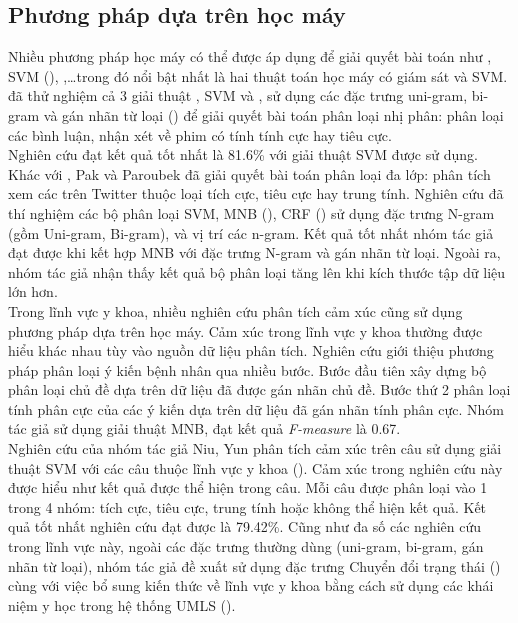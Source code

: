 \subsection{Phương pháp dựa trên học máy}
Nhiều phương pháp học máy có thể được áp dụng để giải quyết bài toán như , SVM (), ,\ldots trong đó nổi bật nhất là hai thuật toán học máy có giám sát  và SVM. \cite{pang2002thumbs} đã thử nghiệm cả 3 giải thuật , SVM và , sử dụng các đặc trưng uni-gram, bi-gram và gán nhãn từ loại () để giải quyết bài toán phân loại nhị phân: phân loại các bình luận, nhận xét về phim có tính tính cực hay tiêu cực. \\

Nghiên cứu đạt kết quả tốt nhất là 81.6\% với giải thuật SVM được sử dụng. Khác với \cite{pang2002thumbs}, Pak và Paroubek \cite{Zhang2015} đã giải quyết bài toán phân loại đa lớp: phân tích xem các  trên Twitter thuộc loại tích cực, tiêu cực hay trung tính. Nghiên cứu đã thí nghiệm các bộ phân loại SVM, MNB (), CRF () sử dụng đặc trưng N-gram (gồm Uni-gram, Bi-gram), và vị trí các n-gram. Kết quả tốt nhất nhóm tác giả đạt được khi kết hợp MNB với đặc trưng N-gram và gán nhãn từ loại. Ngoài ra, nhóm tác giả nhận thấy kết quả bộ phân loại tăng lên khi kích thước tập dữ liệu lớn hơn.\\

Trong lĩnh vực y khoa, nhiều nghiên cứu phân tích cảm xúc cũng sử dụng phương pháp dựa trên học máy. Cảm xúc trong lĩnh vực y khoa thường được hiểu khác nhau tùy vào nguồn dữ liệu phân tích.
Nghiên cứu \cite{xia09improving} giới thiệu phương pháp phân loại ý kiến bệnh nhân qua nhiều bước. Bước đầu tiên xây dựng bộ phân loại chủ đề dựa trên dữ liệu đã được gán nhãn chủ đề. Bước thứ 2 phân loại tính phân cực của các ý kiến dựa trên dữ liệu đã gán nhãn tính phân cực. Nhóm tác giả sử dụng giải thuật MNB, đạt kết quả \textit{F-measure} là 0.67.\\

Nghiên cứu của nhóm tác giả Niu, Yun \cite{niu2005analysis} phân tích cảm xúc trên câu sử dụng giải thuật SVM với các câu thuộc lĩnh vực y khoa (). Cảm xúc trong nghiên cứu này được hiểu như kết quả  được thể hiện trong câu. Mỗi câu được phân loại vào 1 trong 4 nhóm: tích cực, tiêu cực, trung tính hoặc không thể hiện kết quả. Kết quả tốt nhất nghiên cứu đạt được là 79.42\%. Cũng như đa số các nghiên cứu trong lĩnh vực này, ngoài các đặc trưng thường dùng (uni-gram, bi-gram, gán nhãn từ loại), nhóm tác giả đề xuất sử dụng đặc trưng Chuyển đổi trạng thái () cùng với việc bổ sung kiến thức về lĩnh vực y khoa bằng cách sử dụng các khái niệm y học trong hệ thống UMLS (). 

